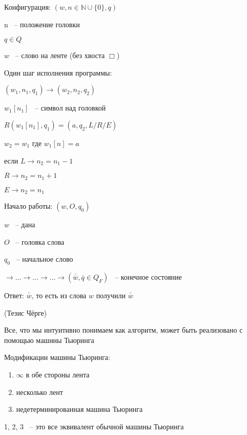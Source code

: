 \documentclass[russian]{lecture-notes}
\begin{document}
    \begin{definition}
        Конфигурация: $(w, n \in \mathbb{N} \cup \{ 0 \}, q)$

        n ~-- положение головки

        $q \in Q$

        $w$ ~-- слово на ленте (без хвоста $\Box$)

        Один шаг исполнения программы:

        $(w_1, n_1, q_1) \rightarrow (w_2, n_2, q_2)$

        $w_1[n_1]$ ~-- символ над головкой

        $R(w_1[n_1], q_1) = (a, q_2, L/R/E)$

        $w_2 = w_1$ где $w_1[n] = a$

        если $L \rightarrow n_2 = n_1 - 1$

        $R \rightarrow n_2 = n_1 + 1$

        $E \rightarrow n_2 = n_1$

        Начало работы: $(w, O, q_0)$

        $w$ ~-- дана

        $O$ ~-- головка слова

        $q_0$ ~-- начальное слово

        $\rightarrow \dots \rightarrow \dots \rightarrow \dots \rightarrow (\overline{\overline{w}}, \overline{q} \in Q_F)$ ~-- конечное состояние

        Ответ: $\overline{\overline{w}}$, то есть из слова $w$ получили $\overline{\overline{w}}$
    \end{definition}

    \begin{remark}
    (Тезис Чёрге)

        Все, что мы интуитивно понимаем как алгоритм, может быть реализовано с помощью машины Тьюринга
    \end{remark}

    \begin{remark}
        Модификации машины Тьюринга:

        \begin{enumerate}
            \item{
                $\infty$ в обе стороны лента
            }
            \item{
                несколько лент
            }
            \item{
                недетерминированная машина Тьюринга
            }
        \end{enumerate}

        1, 2, 3 ~-- это все эквивалент обычной машины Тьюринга
    \end{remark}
\end{document}
